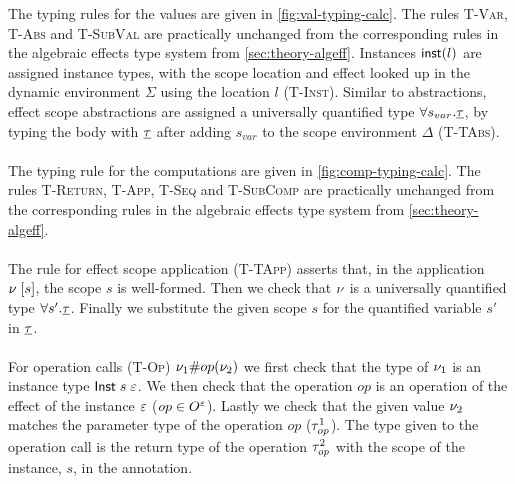 {The typing rules for the values are given in \cref{fig:val-typing-calc}.
The rules \textsc{T-Var}, \textsc{T-Abs} and \textsc{T-SubVal} are practically unchanged from the corresponding rules in the algebraic effects type system from \cref{sec:theory-algeff}.
Instances $\mathsf{inst}(l)$ are assigned instance types, with the scope location and effect looked up in the dynamic environment $\Sigma$ using the location $l$ (\textsc{T-Inst}).
Similar to abstractions, effect scope abstractions are assigned a universally quantified type $\forall s_{var} . \underline{\tau}$, by typing the body with $\underline{\tau}$ after adding $s_{var}$ to the scope environment $\Delta$ (\textsc{T-TAbs}).
\\\\
The typing rule for the computations are given in \cref{fig:comp-typing-calc}.
The rules \textsc{T-Return}, \textsc{T-App}, \textsc{T-Seq} and \textsc{T-SubComp} are practically unchanged from the corresponding rules in the algebraic effects type system from \cref{sec:theory-algeff}.
\\\\
The rule for effect scope application (\textsc{T-TApp}) asserts that, in the application $\nu \; [ s ]$, the scope $s$ is well-formed.
Then we check that $\nu$ is a universally quantified type $\forall s' . \underline{\tau}$.
Finally we substitute the given scope $s$ for the quantified variable $s'$ in $\underline{\tau}$.
\\\\
For operation calls (\textsc{T-Op}) $\nu_1 \# op(\nu_2)$ we first check that the type of $\nu_1$ is an instance type $\mathsf{Inst} \; s \; \varepsilon$.
We then check that the operation $op$ is an operation of the effect of the instance $\varepsilon$ ($op \in O^{\varepsilon}$).
Lastly we check that the given value $\nu_2$ matches the parameter type of the operation $op$ ($\tau^1_{op}$).
The type given to the operation call is the return type of the operation $\tau^2_{op}$ with the scope of the instance, $s$, in the annotation.

}
